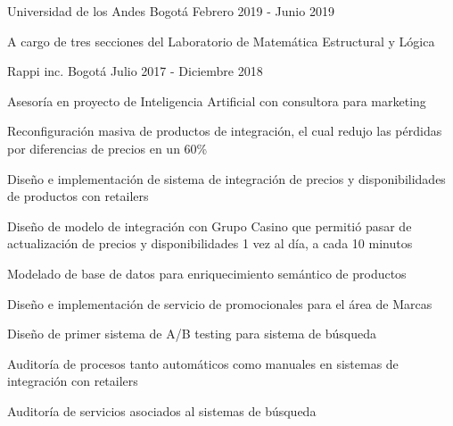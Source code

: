 


\begin{cventries}
  {Universidad de los Andes}
  {Bogotá}
  {Febrero 2019 - Junio 2019}
  {
    \begin{cvitems}
    \item{A cargo de tres secciones del Laboratorio de Matemática Estructural y
    Lógica}
    \end{cvitems}
  }

  {Rappi inc.} %
  {Bogotá} %
  {Julio 2017 - Diciembre 2018} %
  {
    \begin{cvitems}
    \item{Asesoría en proyecto de Inteligencia Artificial con consultora para marketing}
    \item{Reconfiguración masiva de productos de integración, el cual redujo las pérdidas por diferencias de precios en un 60\%}
    \item{Diseño e implementación de sistema de integración de precios y disponibilidades de productos con retailers}
    \item{Diseño de modelo de integración con Grupo Casino que permitió pasar de actualización de precios y disponibilidades 1 vez al día, a cada 10 minutos}
    \item{Modelado de base de datos para enriquecimiento semántico de productos}
    \item{Diseño e implementación de servicio de promocionales para el área de Marcas}
    \item{Diseño de primer sistema de A/B testing para sistema de búsqueda}
    \item{Auditoría de procesos tanto automáticos como manuales en sistemas de integración con retailers}
    \item{Auditoría de servicios asociados al sistemas de búsqueda}
   \end{cvitems}
  } %



\end{cventries}
